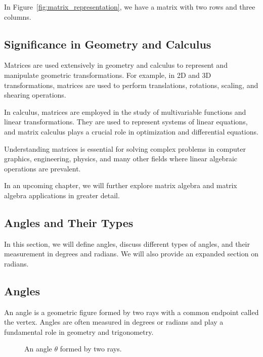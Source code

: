 \documentclass[a4paper,12pt]{book}
\newcounter{problem}
\newcounter{example}
\begin{document}
In Figure~\ref{fig:matrix_representation}, we have a matrix with two rows and three columns.

\subsection{Significance in Geometry and Calculus}

Matrices are used extensively in geometry and calculus to represent and manipulate geometric transformations. For example, in 2D and 3D transformations, matrices are used to perform translations, rotations, scaling, and shearing operations.

In calculus, matrices are employed in the study of multivariable functions and linear transformations. They are used to represent systems of linear equations, and matrix calculus plays a crucial role in optimization and differential equations.

Understanding matrices is essential for solving complex problems in computer graphics, engineering, physics, and many other fields where linear algebraic operations are prevalent.

In an upcoming chapter, we will further explore matrix algebra and matrix algebra applications in greater detail.

\subsection{Angles and Their Types}
\label{subsec:angles_and_their_types}

In this section, we will define angles, discuss different types of angles, and their measurement in degrees and radians. We will also provide an expanded section on radians.

\subsection{Angles}

An angle is a geometric figure formed by two rays with a common endpoint called the vertex. Angles are often measured in degrees or radians and play a fundamental role in geometry and trigonometry.

\begin{figure}[H]
    \centering
    \caption{An angle $\theta$ formed by two rays.}
    \label{fig:angle_definition}
\end{figure}
\end{document}
